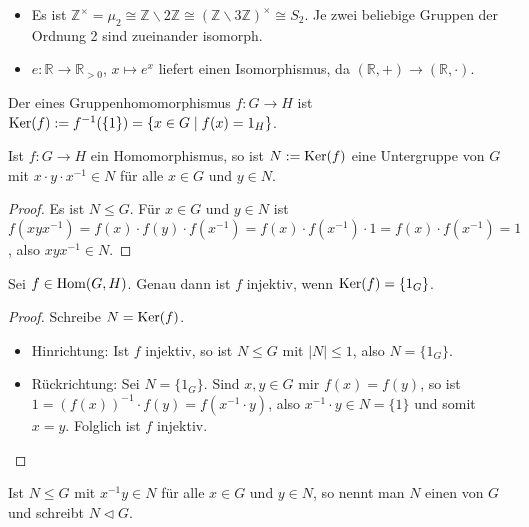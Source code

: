 \begin{example}
	\begin{itemize}
		\item Es ist $\mathbb Z^{\times} = \mu_2 \cong \mathbb Z\backslash 2\mathbb Z\cong (\mathbb Z\backslash 3\mathbb Z)
		^{\times}\cong S_2$. Je zwei beliebige Gruppen der Ordnung 2 sind zueinander isomorph.
		\item $e: \mathbb R \to \mathbb R_{>0}$, $x\mapsto e^x$ liefert einen Isomorphismus, da $(\mathbb R,+)\to 
		(\mathbb R,\cdot)$.
	\end{itemize}
\end{example}

\begin{definition}[Kern]
	Der  eines Gruppenhomomorphismus $f:G\to H$ ist $\operatorname{Ker}(f):= f^{-1}(\{1\})=\{x\in G \mid
	f(x)=1_H\}$.
\end{definition}

\begin{lemma}
	Ist $f:G\to H$ ein Homomorphismus, so ist $N:=\operatorname{Ker}(f)$ eine Untergruppe von $G$ mit $x\cdot y\cdot 
	x^{-1}\in N$ für alle $x\in G$ und $y\in N$.
\end{lemma}
\begin{proof}
	Es ist $N\le G$. Für $x\in G$ und $y\in N$ ist $f(xyx^{-1})=f(x)\cdot f(y)\cdot f(x^{-1})=f(x)\cdot f(x^{-1}) \cdot 1=
	f(x)\cdot f(x^{-1})=1$, also $xyx^{-1}\in N$.
\end{proof}

\begin{proposition}
	Sei $f\in \operatorname{Hom}(G,H)$. Genau dann ist $f$ injektiv, wenn $\operatorname{Ker}(f)=\{1_G\}$.
\end{proposition}
\begin{proof}
	Schreibe $N=\operatorname{Ker}(f)$.
	\begin{itemize}
		\item Hinrichtung: Ist $f$ injektiv, so ist $N\le G$ mit $|N|\le 1$, also $N=\{1_G\}$.
		\item Rückrichtung: Sei $N=\{1_G\}$. Sind $x,y\in G$ mir $f(x)=f(y)$, so ist $1=(f(x))^{-1}\cdot f(y)=f(x^{-1}\cdot y)$, 
		also $x^{-1}\cdot y\in N=\{1\}$ und somit $x=y$. Folglich ist $f$ injektiv.
	\end{itemize}
\end{proof}

\begin{definition}[Normalteiler]
	Ist $N\le G$ mit $x^{-1}y\in N$ für alle $x\in G$ und $y\in N$, so nennt man $N$ 
	einen  von $G$ und schreibt $N\vartriangleleft G$.
\end{definition}